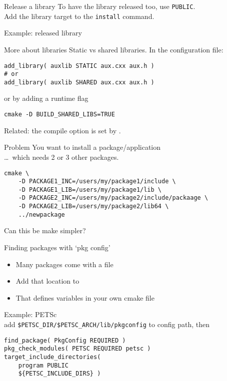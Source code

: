 \begin{numberedframe}{Release a library}
  To have the library released too, use \lstinline{PUBLIC}.\\
  Add the library target to the \lstinline{install} command.
\end{numberedframe}

\begin{numberedframe}{Example: released library}
  \lstset{numbers=left,numberstyle=\tiny}
    
\end{numberedframe}

\begin{numberedframe}{More about libraries}
  Static vs shared libraries.
  In the configuration file:
\begin{lstlisting}
add_library( auxlib STATIC aux.cxx aux.h )
# or
add_library( auxlib SHARED aux.cxx aux.h )
\end{lstlisting}
  or by adding a runtime flag
\begin{verbatim}
cmake -D BUILD_SHARED_LIBS=TRUE
\end{verbatim}
Related: the  compile option
is set by .
\end{numberedframe}


\begin{numberedframe}{Problem}
  You want to install a package/application\\
  \dots~which needs 2 or 3 other packages.
\lstset{language=Bash}
\begin{lstlisting}
cmake \
    -D PACKAGE1_INC=/users/my/package1/include \ 
    -D PACKAGE1_LIB=/users/my/package1/lib \ 
    -D PACKAGE2_INC=/users/my/package2/include/packaage \ 
    -D PACKAGE2_LIB=/users/my/package2/lib64 \ 
    ../newpackage
\end{lstlisting}
Can this be make simpler?
\end{numberedframe}

\begin{numberedframe}{Finding packages with `pkg config'}
  \begin{itemize}
  \item Many packages come with a  file
  \item Add that location to 
  \item That defines variables in your own cmake file
  \end{itemize}
Example: PETSc\\
add \verb+$PETSC_DIR/$PETSC_ARCH/lib/pkgconfig+ to config path,
then
\begin{lstlisting}
find_package( PkgConfig REQUIRED )
pkg_check_modules( PETSC REQUIRED petsc )
target_include_directories(
	program PUBLIC
	${PETSC_INCLUDE_DIRS} )
\end{lstlisting}
\end{numberedframe}

